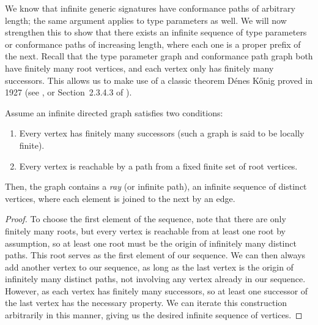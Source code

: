 \documentclass[../generics]{subfiles}
\begin{document}
We know that infinite generic signatures have conformance paths of arbitrary length; the same argument applies to type parameters as well. We will now strengthen this to show that there exists an infinite sequence of type parameters or conformance paths of increasing length, where each one is a proper prefix of the next. Recall that the type parameter graph and conformance path graph both have finitely many root vertices, and each vertex only has finitely many successors. This allows us to make use of a classic theorem D\'enes K\H{o}nig proved in 1927 (see \cite{konig}, or Section~2.3.4.3 of \cite{art1}).
\begin{theorem}
Assume an infinite directed graph satisfies two conditions:
\begin{enumerate}
\item Every vertex has finitely many successors (such a graph is said to be locally finite).
\item Every vertex is reachable by a path from a fixed finite set of root vertices.
\end{enumerate}
Then, the graph contains a \emph{ray}  (or infinite path), an infinite sequence of distinct vertices, where each element is joined to the next by an edge.
\end{theorem}
\begin{proof}
To choose the first element of the sequence, note that there are only finitely many roots, but every vertex is reachable from at least one root by assumption, so at least one root must be the origin of infinitely many distinct paths. This root serves as the first element of our sequence. We can then always add another vertex to our sequence, as long as the last vertex is the origin of infinitely many distinct paths, not involving any vertex already in our sequence. However, as each vertex has finitely many successors, so at least one successor of the last vertex has the necessary property. We can iterate this construction arbitrarily in this manner, giving us the desired infinite sequence of vertices.
\end{proof}

\newcommand{\SelfAToN}{\AssocConf{Self.A}{N}}
\end{document}
